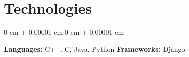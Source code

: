 \documentclass[10pt, letterpaper]{article}
\newenvironment{onecolentry}{
    \begin{adjustwidth}{
        0 cm + 0.00001 cm
    }{
        0 cm + 0.00001 cm
    }
}{
    \end{adjustwidth}
} %
\begin{document}
        \vspace{0.2 cm}

    \section{Technologies}



        
        \begin{onecolentry}
            \textbf{Languages:} C++, C, Java, Python
            \textbf{Frameworks:} Django
        \end{onecolentry}

        \vspace{0.2 cm}


    
\end{document}

